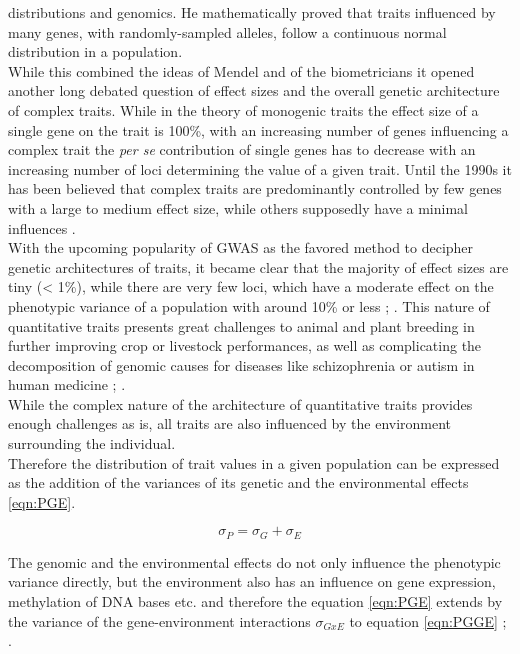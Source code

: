 distributions and genomics. He mathematically proved that traits influenced by many genes,
with randomly-sampled alleles, follow a continuous normal distribution in a
population. \\
While this combined the ideas of Mendel and of the biometricians it opened another long
debated question of effect sizes and the overall genetic architecture of complex
traits. While in the theory of monogenic traits the effect size of a single gene on the
trait is 100\%, with an increasing number of genes influencing a complex trait the
\textit{per se} contribution of single genes has to decrease with an increasing number of
loci determining the value of a given trait. Until the 1990s it has been believed that
complex traits are predominantly controlled by few genes with a
large to medium effect size, while others supposedly have a minimal influences \cite{zhang2018esti}. \\
With the upcoming popularity of GWAS as the favored method to decipher genetic
architectures of traits, it became clear that the majority of effect sizes are tiny (<
1\%), while there are very few loci, which have a moderate effect on the phenotypic
variance of a population with around 10\% or less \cite{stringer2011};
\cite{korte2013advantages}. This nature of quantitative traits presents great challenges
to animal \cite{goddard2009} and plant breeding \cite{wurschum2012} in further improving
crop or livestock performances, as well as
complicating the decomposition of genomic causes for diseases like schizophrenia or autism in human medicine \cite{de2014}; \cite{purcell2014}. \\
While the complex nature of the architecture of quantitative traits provides enough
challenges as is, all traits are also influenced by the environment surrounding the individual.\\
Therefore the distribution of trait values in a given population can be expressed as the
addition of the variances of its genetic and the environmental effects \ref{eqn:PGE}.

\begin{equation}
 \sigma_{P} = \sigma_{G} + \sigma_{E}
 \label{eqn:PGE}
\end{equation}

The genomic and the environmental effects do not only influence the phenotypic variance directly, but
the environment also has an influence on gene expression, methylation of DNA bases etc. and
therefore the equation \ref{eqn:PGE} extends by the variance of the gene-environment
interactions $\sigma_{GxE}$  to equation \ref{eqn:PGGE}  \cite{lynch1998}; \cite{walsh2018}.
    
